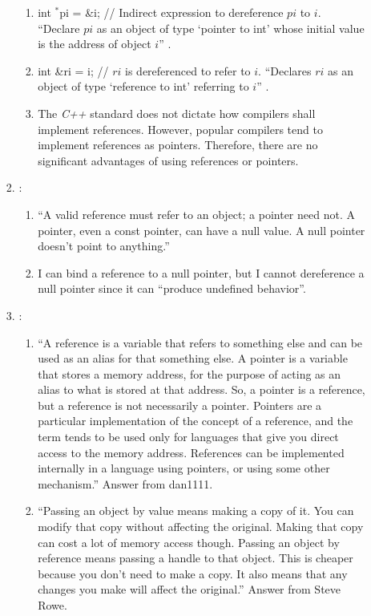 \begin{enumerate}
\begin{enumerate}
\begin{enumerate}
			\begin{enumerate} \itemsep -1pt
			\item int $^{\ast}$pi = {\&}i; // Indirect expression to dereference $pi$ to $i$. ``Declare $pi$ as an object of type `pointer to int' whose initial value is the address of object $i$'' \cite{Saks2001a}.
			\item int {\&}ri = i; // $ri$ is dereferenced to refer to $i$. ``Declares $ri$ as an object of type `reference to int' referring to $i$'' \cite{Saks2001a}.
			\item The {\it C++} standard does not dictate how compilers shall implement references. However, popular compilers tend to implement references as pointers. Therefore, there are no significant advantages of using references or pointers.
			\end{enumerate}
		\item \cite{Saks2001a}: \vspace{-0.1cm}
			\begin{enumerate} \itemsep -1pt
			\item ``A valid reference must refer to an object; a pointer need not. A pointer, even a const pointer, can have a null value. A null pointer doesn't point to anything.''
			\item I can bind a reference to a null pointer, but I cannot dereference a null pointer since it can ``produce undefined behavior''.
			\end{enumerate}
		\item \cite{Ozcan2013}: \vspace{-0.1cm}
			\begin{enumerate} \itemsep -1pt
			\item ``A reference is a variable that refers to something else and can be used as an alias for that something else. A pointer is a variable that stores a memory address, for the purpose of acting as an alias to what is stored at that address. So, a pointer is a reference, but a reference is not necessarily a pointer. Pointers are a particular implementation of the concept of a reference, and the term tends to be used only for languages that give you direct access to the memory address. References can be implemented internally in a language using pointers, or using some other mechanism.'' Answer from dan1111.
			\item ``Passing an object by value means making a copy of it. You can modify that copy without affecting the original. Making that copy can cost a lot of memory access though. Passing an object by reference means passing a handle to that object. This is cheaper because you don't need to make a copy. It also means that any changes you make will affect the original.'' Answer from Steve Rowe.

\end{enumerate}
\end{enumerate}
\end{enumerate}
\end{enumerate}
